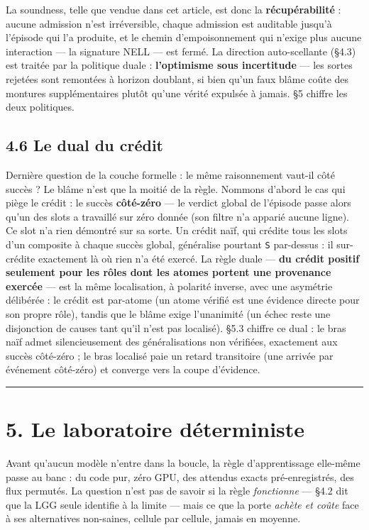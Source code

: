 \documentclass[11pt]{article}
\begin{document}
La soundness, telle que vendue dans cet article, est donc la \textbf{récupérabilité} : aucune admission n'est irréversible, chaque admission est auditable jusqu'à l'épisode qui l'a produite, et le chemin d'empoisonnement qui n'exige plus aucune interaction — la signature NELL — est fermé. La direction auto-scellante (§4.3) est traitée par la politique duale : \textbf{l'optimisme sous incertitude} — les sortes rejetées sont remontées à horizon doublant, si bien qu'un faux blâme coûte des montures supplémentaires plutôt qu'une vérité expulsée à jamais. §5 chiffre les deux politiques.

\subsection*{4.6 Le dual du crédit}

Dernière question de la couche formelle : le même raisonnement vaut-il côté succès ? Le blâme n'est que la moitié de la règle. Nommons d'abord le cas qui piège le crédit : le succès \textbf{côté-zéro} — le verdict global de l'épisode passe alors qu'un des slots a travaillé sur zéro donnée (son filtre n'a apparié aucune ligne). Ce slot n'a rien démontré sur sa sorte. Un crédit naïf, qui crédite tous les slots d'un composite à chaque succès global, généralise pourtant \texttt{S} par-dessus : il sur-crédite exactement là où rien n'a été exercé. La règle duale — \textbf{du crédit positif seulement pour les rôles dont les atomes portent une provenance exercée} — est la même localisation, à polarité inverse, avec une asymétrie délibérée : le crédit est par-atome (un atome vérifié est une évidence directe pour son propre rôle), tandis que le blâme exige l'unanimité (un échec reste une disjonction de causes tant qu'il n'est pas localisé). §5.3 chiffre ce dual : le bras naïf admet silencieusement des généralisations non vérifiées, exactement aux succès côté-zéro ; le bras localisé paie un retard transitoire (une arrivée par événement côté-zéro) et converge vers la coupe d'évidence.

\medskip\hrule\medskip

\section*{5. Le laboratoire déterministe}

Avant qu'aucun modèle n'entre dans la boucle, la règle d'apprentissage elle-même passe au banc : du code pur, zéro GPU, des attendus exacts pré-enregistrés, des flux permutés. La question n'est pas de savoir si la règle \emph{fonctionne} — §4.2 dit que la LGG seule identifie à la limite — mais ce que la porte \emph{achète et coûte} face à ses alternatives non-saines, cellule par cellule, jamais en moyenne.
\end{document}
